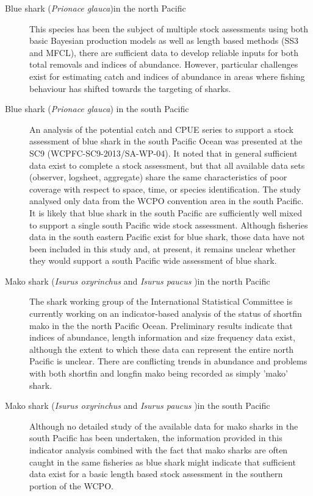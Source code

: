 \documentclass[12pt]{SCreport}
\begin{document}
\begin{description}
  \item[Blue shark (\emph{Prionace glauca})in the north Pacific] This species has been the subject of multiple stock assessments using both basic Bayesian production models as well as length based methods (SS3 and MFCL), there are sufficient data to develop reliable inputs for both total removals and indices of abundance. However, particular challenges exist for estimating catch and indices of abundance in areas where  fishing behaviour has shifted towards the targeting of sharks.
  
\item[Blue shark (\emph{Prionace glauca}) in the south Pacific]
An analysis of the potential catch and CPUE series to support a stock assessment of blue shark in the south Pacific Ocean was presented at the  SC9 (WCPFC-SC9-2013/SA-WP-04). It noted that in general sufficient data exist to complete a stock assessment, but that all available data sets (observer, logsheet, aggregate) share the same characteristics of poor coverage with respect to space, time, or species identification.  The study analysed only  data from the WCPO convention area in the south Pacific. It is likely that blue shark in the south Pacific are sufficiently well mixed to support a single south Pacific wide stock assessment. Although fisheries data in the south  eastern Pacific exist for blue shark, those data have not been included in this  study and, at present, it remains unclear whether they would support a south Pacific wide assessment of blue shark.

\item[Mako shark (\emph{Isurus oxyrinchus} and \emph{Isurus paucus} )in the north Pacific] The shark working group of the International Statistical Committee is currently working on an indicator-based analysis of the status of shortfin mako in the the north Pacific Ocean. Preliminary results indicate that indices of abundance, length information and size frequency data exist, although the extent to which these data can represent the   entire north Pacific is unclear. There are conflicting trends in abundance and problems with both shortfin and longfin mako being recorded as simply 'mako' shark.

\item[Mako shark (\emph{Isurus oxyrinchus} and \emph{Isurus paucus} )in the south Pacific] Although no detailed study of the available data for mako sharks in the south Pacific has been undertaken, the information provided in this indicator analysis combined with the fact that mako sharks are often caught in the same fisheries as blue shark might indicate that sufficient data exist for a basic length based stock assessment in the southern portion of the WCPO. 


\end{description}
\end{document}
